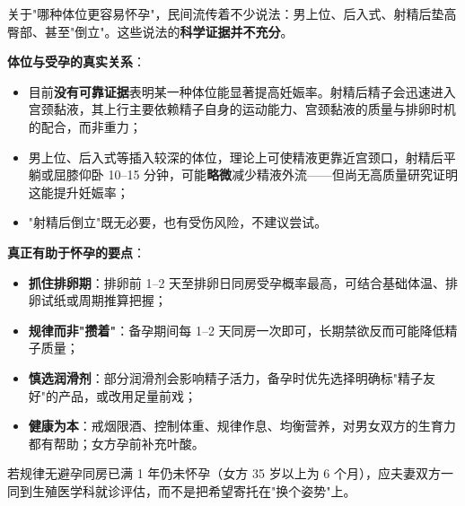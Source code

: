 关于"哪种体位更容易怀孕"，民间流传着不少说法：男上位、后入式、射精后垫高臀部、甚至"倒立"。这些说法的\textbf{科学证据并不充分}。

\noindent\textbf{体位与受孕的真实关系}：
\begin{itemize}
	\item 目前\textbf{没有可靠证据}表明某一种体位能显著提高妊娠率。射精后精子会迅速进入宫颈黏液，其上行主要依赖精子自身的运动能力、宫颈黏液的质量与排卵时机的配合，而非重力；
	\item 男上位、后入式等插入较深的体位，理论上可使精液更靠近宫颈口，射精后平躺或屈膝仰卧 10--15 分钟，可能\textbf{略微}减少精液外流——但尚无高质量研究证明这能提升妊娠率；
	\item "射精后倒立"既无必要，也有受伤风险，不建议尝试。
\end{itemize}

\noindent\textbf{真正有助于怀孕的要点}：
\begin{itemize}
	\item \textbf{抓住排卵期}：排卵前 1--2 天至排卵日同房受孕概率最高，可结合基础体温、排卵试纸或周期推算把握；
	\item \textbf{规律而非"攒着"}：备孕期间每 1--2 天同房一次即可，长期禁欲反而可能降低精子质量；
	\item \textbf{慎选润滑剂}：部分润滑剂会影响精子活力，备孕时优先选择明确标"精子友好"的产品，或改用足量前戏；
	\item \textbf{健康为本}：戒烟限酒、控制体重、规律作息、均衡营养，对男女双方的生育力都有帮助；女方孕前补充叶酸。
\end{itemize}

\begin{tcolorbox}[colback=pink!5!white,colframe=red!50!black,title=贴心小叮咛]
若规律无避孕同房已满 1 年仍未怀孕（女方 35 岁以上为 6 个月），应夫妻双方一同到生殖医学科就诊评估，而不是把希望寄托在"换个姿势"上。
\end{tcolorbox}
